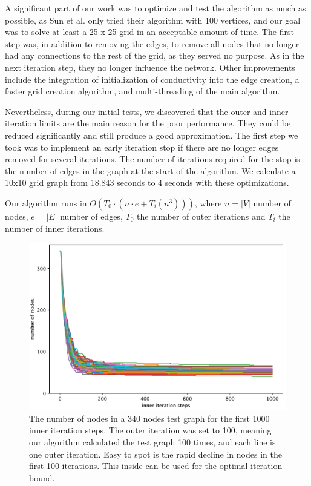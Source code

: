 A significant part of our work was to optimize and test the algorithm as much as possible, as Sun et al. \cite{sun_fast_2016} only tried their algorithm with 100 vertices, and our goal was to solve at least a 25 x 25 grid in an acceptable amount of time.
The first step was, in addition to removing the edges, to remove all nodes that no longer had any connections to the rest of the grid, as they served no purpose. As in the next iteration step, they no longer influence the network. Other improvements include the integration of initialization of conductivity into the edge creation, a faster grid creation algorithm, and multi-threading of the main algorithm. 

Nevertheless, during our initial tests, we discovered that the outer and inner iteration limits are the main reason for the poor performance. They could be reduced significantly and still produce a good approximation. The first step we took was to implement an early iteration stop if there are no longer edges removed for several iterations. The number of iterations required for the stop is the number of edges in the graph at the start of the algorithm. We calculate a 10x10 grid graph from 18.843 seconds to 4 seconds with these optimizations.

Our algorithm runs in $O\left(T_0 \cdot \left(n \cdot e + T_i\left(n^3\right)\right)\right)$, where $n = |V|$ number of nodes, $e = |E|$ number of edges, $T_0$ the number of outer iterations and $T_i$ the number of inner iterations.

\newpage

\begin{figure}[H]
  \centering
  \includegraphics[width=1\linewidth]{figures/inner_iteration.pdf}
  \caption{The number of nodes in a 340 nodes test graph for the first 1000 inner iteration steps. The outer iteration was set to 100, meaning our algorithm calculated the test graph 100 times, and each line is one outer iteration. Easy to spot is the rapid decline in nodes in the first 100 iterations. This inside can be used for the optimal iteration bound.}
  \label{fig:inner_plots}
\end{figure}

